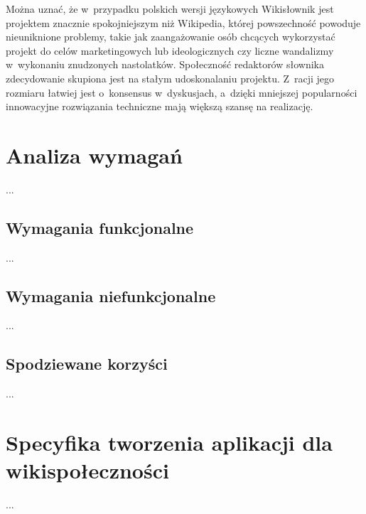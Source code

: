 Można uznać, że w~przypadku polskich wersji językowych Wikisłownik jest projektem znacznie spokojniejszym niż Wikipedia, której powszechność powoduje nieuniknione problemy, takie jak zaangażowanie osób chcących wykorzystać projekt do celów marketingowych lub ideologicznych czy liczne wandalizmy w~wykonaniu znudzonych nastolatków. Społeczność redaktorów słownika zdecydowanie skupiona jest na stałym udoskonalaniu projektu. Z~racji jego rozmiaru łatwiej jest o~konsensus w~dyskusjach, a~dzięki mniejszej popularności innowacyjne rozwiązania techniczne mają większą szansę na realizację.




\section{Analiza wymagań}
...
\subsection{Wymagania funkcjonalne}
...
\subsection{Wymagania niefunkcjonalne}
...
\subsection{Spodziewane korzyści}
...

\section{Specyfika tworzenia aplikacji dla wikispołeczności}
...
